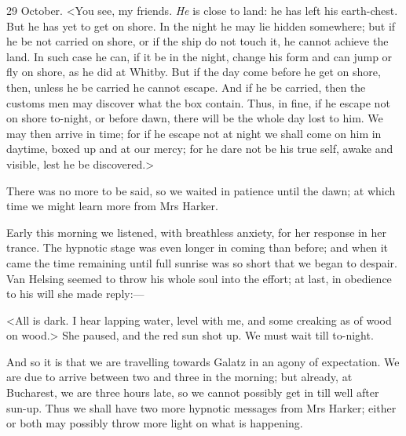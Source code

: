 \begin{diary}{29 October.}
<You see, my friends. \textit{He} is close to land: he has left his earth-chest. But he has yet to get on shore. In the night he may lie hidden somewhere; but if he be not carried on shore, or if the ship do not touch it, he cannot achieve the land. In such case he can, if it be in the night, change his form and can jump or fly on shore, as he did at Whitby. But if the day come before he get on shore, then, unless he be carried he cannot escape. And if he be carried, then the customs men may discover what the box contain. Thus, in fine, if he escape not on shore to-night, or before dawn, there will be the whole day lost to him. We may then arrive in time; for if he escape not at night we shall come on him in daytime, boxed up and at our mercy; for he dare not be his true self, awake and visible, lest he be discovered.>

There was no more to be said, so we waited in patience until the dawn; at which time we might learn more from Mrs Harker.

Early this morning we listened, with breathless anxiety, for her response in her trance. The hypnotic stage was even longer in coming than before; and when it came the time remaining until full sunrise was so short that we began to despair. Van Helsing seemed to throw his whole soul into the effort; at last, in obedience to his will she made reply:—

<All is dark. I hear lapping water, level with me, and some creaking as of wood on wood.> She paused, and the red sun shot up. We must wait till to-night.

And so it is that we are travelling towards Galatz in an agony of expectation. We are due to arrive between two and three in the morning; but already, at Bucharest, we are three hours late, so we cannot possibly get in till well after sun-up. Thus we shall have two more hypnotic messages from Mrs Harker; either or both may possibly throw more light on what is happening.
\end{diary}

 

